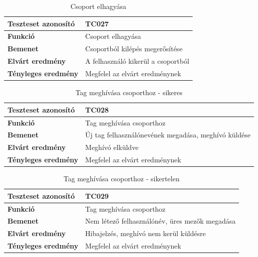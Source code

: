 \begin{table}[h!]
	\centering
	\begin{tabular}{|l|p{10cm}|}
		\hline
		\textbf{Teszteset azonosító} & TC027 \\ \hline
		\textbf{Funkció} & Csoport elhagyása \\ \hline
		\textbf{Bemenet} & Csoportból kilépés megerősítése \\ \hline
		\textbf{Elvárt eredmény} & A felhasználó kikerül a csoportból \\ \hline
		\textbf{Tényleges eredmény} & Megfelel az elvárt eredménynek \\ \hline
	\end{tabular}
	\caption{Csoport elhagyása}
	\label{tab:csoport_elhagyasa}
\end{table}

\begin{table}[h!]
	\centering
	\begin{tabular}{|l|p{10cm}|}
		\hline
		\textbf{Teszteset azonosító} & TC028 \\ \hline
		\textbf{Funkció} & Tag meghívása csoporthoz \\ \hline
		\textbf{Bemenet} & Új tag felhasználónevének megadása, meghívó küldése \\ \hline
		\textbf{Elvárt eredmény} & Meghívó elküldve\\ \hline
		\textbf{Tényleges eredmény} & Megfelel az elvárt eredménynek \\ \hline
	\end{tabular}
	\caption{Tag meghívása csoporthoz - sikeres}
	\label{tab:tag_hozzaadasa}
\end{table}

\begin{table}[h!]
	\centering
	\begin{tabular}{|l|p{10cm}|}
		\hline
		\textbf{Teszteset azonosító} & TC029 \\ \hline
		\textbf{Funkció} & Tag meghívása csoporthoz \\ \hline
		\textbf{Bemenet} & Nem létező felhasználónév, üres mezők megadása \\ \hline
		\textbf{Elvárt eredmény} & Hibajelzés, meghívó nem kerül küldésre\\ \hline
		\textbf{Tényleges eredmény} & Megfelel az elvárt eredménynek \\ \hline
	\end{tabular}
	\caption{Tag meghívása csoporthoz - sikertelen}
	\label{tab:tag_hozzaadasa_sikertelen}
\end{table}

